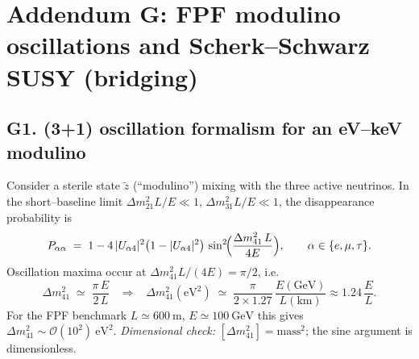 \documentclass[11pt]{article}
\begin{document}
  \titlepageOpen

  \begin{abstract}


  \end{abstract}

  \titlepageClose
  \fi

  \ifdefined\standalonechapter
  \section{\papertitle}
  \else
  \fi



  \section*{Addendum G: FPF modulino oscillations and Scherk--Schwarz SUSY (bridging)}

      \subsection*{G1. (3+1) oscillation formalism for an eV--keV modulino}
          Consider a sterile state $\tilde z$ (``modulino'') mixing with the three active neutrinos. In the short--baseline limit
          $\Delta m^2_{21}L/E\ll1$, $\Delta m^2_{31}L/E\ll1$, the disappearance probability is
          \begin{equation}
          P_{\alpha\alpha}
          \;=\;
          1 - 4\,|U_{\alpha4}|^2\bigl(1-|U_{\alpha4}|^2\bigr)\,
          \sin^2\!\Bigl(\frac{\Delta m^2_{41}\,L}{4E}\Bigr),
          \qquad \alpha\in\{e,\mu,\tau\}.
          \end{equation}
          Oscillation maxima occur at $\Delta m^2_{41} L/(4E)=\pi/2$, i.e.
          \begin{equation}
          \Delta m^2_{41}\;\simeq\;\frac{\pi\,E}{2\,L}
          \;\;\;\Rightarrow\;\;\;
          \Delta m^2_{41}(\mathrm{eV}^2)\;\simeq\;\frac{\pi}{2\times1.27}\,
          \frac{E(\mathrm{GeV})}{L(\mathrm{km})}
          \approx 1.24\,\frac{E}{L}.
          \end{equation}
          For the FPF benchmark $L\simeq 600~\mathrm{m}$, $E\simeq 100~\mathrm{GeV}$ this gives
          $\Delta m^2_{41}\sim \mathcal O(10^2)~\mathrm{eV}^2$.
          \textit{Dimensional check:} $[\Delta m^2_{41}]=\mathrm{mass}^2$; the sine argument is dimensionless.
\end{document}
